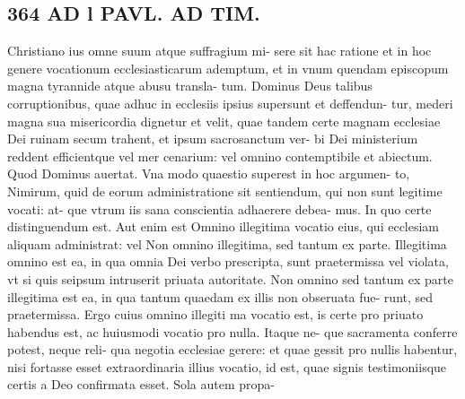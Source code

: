 \documentclass{article}
\begin{document}
\begin{pages}
\section*{364 AD l PAVL. AD TIM. }\pstart Christiano ius omne suum atque suffragium mi- sere sit hac ratione et in hoc genere vocationum ecclesiasticarum ademptum, et in vnum quendam episcopum magna tyrannide atque abusu transla- tum. Dominus Deus talibus corruptionibus, quae adhuc in ecclesiis ipsius supersunt et deffendun- tur, mederi magna sua misericordia dignetur et velit, quae tandem certe magnam ecclesiae Dei ruinam secum trahent, et ipsum sacrosanctum ver- bi Dei ministerium reddent efficientque vel mer cenarium: vel omnino contemptibile et abiectum. Quod Dominus auertat. Vna modo quaestio superest in hoc argumen- to, Nimirum, quid de eorum administratione sit sentiendum, qui non sunt legitime vocati: at- que vtrum iis sana conscientia adhaerere debea- mus. In quo certe distinguendum est. Aut enim est Omnino illegitima vocatio eius, qui ecclesiam aliquam administrat: vel Non omnino illegitima, sed tantum ex parte. Illegitima omnino est ea, in qua omnia Dei verbo prescripta, sunt praetermissa vel violata, vt si quis seipsum intruserit priuata autoritate. Non omnino sed tantum ex parte illegitima est ea, in qua tantum quaedam ex illis non obseruata fue- runt, sed praetermissa. Ergo cuius omnino illegiti ma vocatio est, is certe pro priuato habendus est, ac huiusmodi vocatio pro nulla. Itaque ne- que sacramenta conferre potest, neque reli- qua negotia ecclesiae gerere: et quae gessit pro nullis habentur, nisi fortasse esset extraordinaria illius vocatio, id est, quae signis testimoniisque certis a Deo confirmata esset. Sola autem propa-  \pend

\end{pages}
\end{document}
